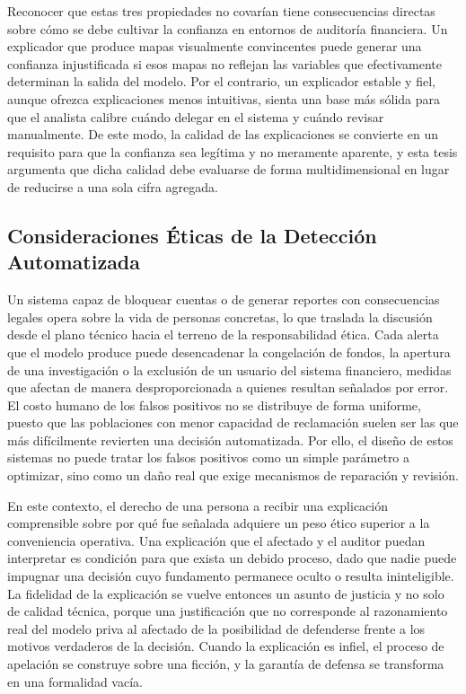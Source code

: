 Reconocer que estas tres propiedades no covarían tiene consecuencias directas sobre cómo se debe cultivar la confianza en entornos de auditoría financiera. Un explicador que produce mapas visualmente convincentes puede generar una confianza injustificada si esos mapas no reflejan las variables que efectivamente determinan la salida del modelo. Por el contrario, un explicador estable y fiel, aunque ofrezca explicaciones menos intuitivas, sienta una base más sólida para que el analista calibre cuándo delegar en el sistema y cuándo revisar manualmente. De este modo, la calidad de las explicaciones se convierte en un requisito para que la confianza sea legítima y no meramente aparente, y esta tesis argumenta que dicha calidad debe evaluarse de forma multidimensional en lugar de reducirse a una sola cifra agregada.

\subsection{Consideraciones Éticas de la Detección Automatizada}

Un sistema capaz de bloquear cuentas o de generar reportes con consecuencias legales opera sobre la vida de personas concretas, lo que traslada la discusión desde el plano técnico hacia el terreno de la responsabilidad ética. Cada alerta que el modelo produce puede desencadenar la congelación de fondos, la apertura de una investigación o la exclusión de un usuario del sistema financiero, medidas que afectan de manera desproporcionada a quienes resultan señalados por error. El costo humano de los falsos positivos no se distribuye de forma uniforme, puesto que las poblaciones con menor capacidad de reclamación suelen ser las que más difícilmente revierten una decisión automatizada. Por ello, el diseño de estos sistemas no puede tratar los falsos positivos como un simple parámetro a optimizar, sino como un daño real que exige mecanismos de reparación y revisión.

En este contexto, el derecho de una persona a recibir una explicación comprensible sobre por qué fue señalada adquiere un peso ético superior a la conveniencia operativa. Una explicación que el afectado y el auditor puedan interpretar es condición para que exista un debido proceso, dado que nadie puede impugnar una decisión cuyo fundamento permanece oculto o resulta ininteligible. La fidelidad de la explicación se vuelve entonces un asunto de justicia y no solo de calidad técnica, porque una justificación que no corresponde al razonamiento real del modelo priva al afectado de la posibilidad de defenderse frente a los motivos verdaderos de la decisión. Cuando la explicación es infiel, el proceso de apelación se construye sobre una ficción, y la garantía de defensa se transforma en una formalidad vacía.


